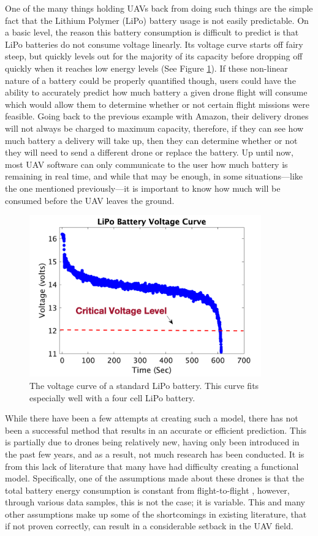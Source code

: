 \documentclass{article}
\begin{document}
One of the many things holding UAVs back from doing such things are the simple fact that the Lithium Polymer (LiPo) battery usage is not easily predictable. On a basic level, the reason this battery consumption is difficult to predict is that LiPo batteries do not consume voltage linearly. Its voltage curve starts off fairy steep, but quickly levels out for the majority of its capacity before dropping off quickly when it reaches low energy levels (See Figure \ref{fig:volt}). If these non-linear nature of a battery could be properly quantified though, users could have the ability to accurately predict how much battery a given drone flight will consume which would allow them to determine whether or not certain flight missions were feasible. Going back to the previous example with Amazon, their delivery drones will not always be charged to maximum capacity, therefore, if they can see how much battery a delivery will take up, then they can determine whether or not they will need to send a different drone or replace the battery. Up until now, most UAV software can only communicate to the user how much battery is remaining in real time, and while that may be enough, in some situations—like the one mentioned previously—it is important to know how much will be consumed before the UAV leaves the ground.\par

\begin{figure}[!h]
	\centering
	\includegraphics[width = 100mm]{images/voltage.png}
	\caption{The voltage curve of a standard LiPo battery. This curve fits especially well with a four cell LiPo battery.}
	\label{fig:volt}
\end{figure}

While there have been a few attempts at creating such a model, there has not been a successful method that results in an accurate or efficient prediction. This is partially due to drones being relatively new, having only been introduced in the past few years, and as a result, not much research has been conducted. It is from this lack of literature that many have had difficulty creating a functional model. Specifically, one of the assumptions made about these drones is that the total battery energy consumption is constant from flight-to-flight \cite{Prasetia}, however, through various data samples, this is not the case; it is variable. This and many other assumptions make up some of the shortcomings in existing literature, that if not proven correctly, can result in a considerable setback in the UAV field. 
\end{document}
